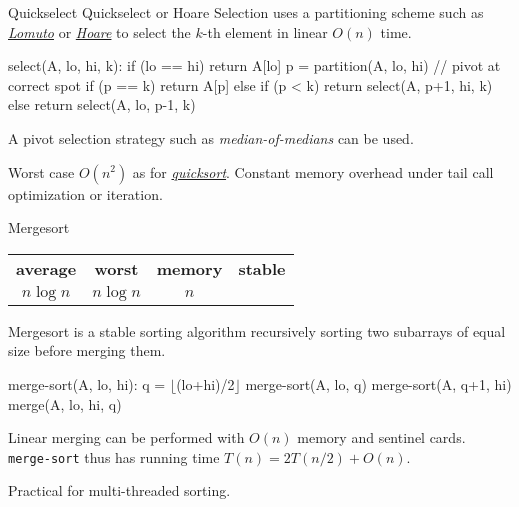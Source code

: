 \documentclass{cognito}
\begin{document}
\begin{note}{Quickselect}
	Quickselect or Hoare Selection uses a partitioning scheme such as \hyperref[note:Lomuto Partitioning]{\it Lomuto} or \hyperref[note:Hoare Partitioning]{\it Hoare}
	to select the $k$-th element in linear $O(n)$ time.
	\begin{largecode}
select(A, lo, hi, k):
	if (lo == hi) return A[lo]
	p = partition(A, lo, hi)  // pivot at correct spot
	if (p == k) return A[p]
	else if (p < k) return select(A, p+1, hi, k)
	else return select(A, lo, p-1, k)
	\end{largecode}
	A pivot selection strategy such as \emph{median-of-medians} can be used.
	\begin{remark} Worst case $O(n^2)$ as for \hyperref[note:Quicksort]{\it quicksort}.
		Constant memory overhead under tail call optimization or iteration.
	\end{remark}
	\vspace{-5pt}
\end{note}


\begin{note}{Mergesort}
	\begin{mdframed}[linecolor=black!25!white]%
	\begin{tabular}{@{} c | c | c | c  @{}}
		\bf average & \bf worst & \bf memory & \bf stable \\
		$n \log n$ & $n \log n$ & $n$ & \checkmark
	\end{tabular}%
	\end{mdframed}
	Mergesort is a stable sorting algorithm recursively sorting two subarrays
	of equal size before merging them.
	\begin{largecode}
merge-sort(A, lo, hi):
	q = $\lfloor$(lo+hi)/2$\rfloor$
	merge-sort(A, lo, q)
	merge-sort(A, q+1, hi)
	merge(A, lo, hi, q)
	\end{largecode}
	Linear merging can be performed with $O(n)$ memory and sentinel cards.
	{\tt merge-sort} thus has running time $T(n) = 2T(n/2) + O(n)$.

	\begin{remark} Practical for multi-threaded sorting.\end{remark}\vspace{-5pt}
\end{note}
\end{document}
